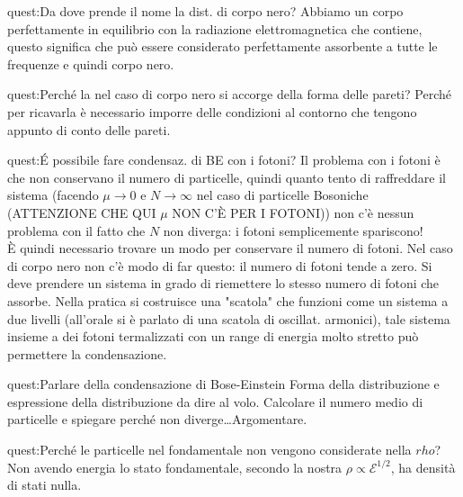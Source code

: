 \begin{quest}{quest:Da dove prende il nome la dist. di corpo nero?}
    Abbiamo un corpo perfettamente in equilibrio con la radiazione elettromagnetica che contiene, questo significa che può essere considerato perfettamente assorbente a tutte le frequenze e quindi corpo nero. 
\end{quest}
\begin{quest}{quest:Perché la  nel caso di corpo nero si accorge della forma delle pareti?}
Perché per ricavarla è necessario imporre delle condizioni al contorno che tengono appunto di conto delle pareti. 
\end{quest}
\begin{quest}{quest:É possibile fare condensaz. di BE con i fotoni?}
    Il problema con i fotoni è che non conservano il numero di particelle, quindi quanto tento di raffreddare il sistema (facendo $\mu\to 0$ e $N\to \infty$ nel caso di particelle Bosoniche (ATTENZIONE CHE QUI $\mu$ NON C'È PER I FOTONI)) non c'è nessun problema con il fatto che $N$ non diverga: i fotoni semplicemente spariscono!\\
    È quindi necessario trovare un modo per conservare il numero di fotoni. Nel caso di corpo nero non c'è modo di far questo: il numero di fotoni tende a zero. 
    Si deve prendere un sistema in grado di riemettere lo stesso numero di fotoni che assorbe. Nella pratica si costruisce una "scatola" che funzioni come un sistema a due livelli (all'orale si è parlato di una scatola di oscillat. armonici), tale sistema insieme a dei fotoni termalizzati con un range di energia molto stretto può permettere la condensazione.
\end{quest}
\begin{quest}{quest:Parlare della condensazione di Bose-Einstein}
Forma della distribuzione e espressione della distribuzione da dire al volo. Calcolare il numero medio di particelle e spiegare perché non diverge\ldots Argomentare.
\end{quest}
\begin{quest}{quest:Perché le particelle nel fondamentale non vengono considerate nella $rho$?}
Non avendo energia lo stato fondamentale, secondo la nostra $\rho \propto  \mathcal{E}^{1 /2}$, ha densità di stati nulla.
\end{quest}
